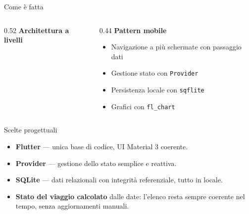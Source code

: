 \documentclass[aspectratio=169,11pt]{beamer}
\begin{document}
\begin{frame}{Come è fatta}
  \begin{columns}[T]
    \begin{column}{0.52\textwidth}
      \textbf{\color{primary}Architettura a livelli}
      \vspace{4pt}
      \begin{center}
      \end{center}
    \end{column}
    \begin{column}{0.44\textwidth}
      \textbf{\color{primary}Pattern mobile}
      \begin{itemize}
        \item Navigazione a più schermate con passaggio dati
        \item Gestione stato con \texttt{Provider}
        \item Persistenza locale con \texttt{sqflite}
        \item Grafici con \texttt{fl\_chart}
      \end{itemize}
    \end{column}
  \end{columns}
\end{frame}

\begin{frame}{Scelte progettuali}
  \begin{itemize}
    \item \textbf{Flutter} --- unica base di codice, UI Material 3 coerente.
    \item \textbf{Provider} --- gestione dello stato semplice e reattiva.
    \item \textbf{SQLite} --- dati relazionali con integrità referenziale, tutto in locale.
    \item \textbf{Stato del viaggio calcolato} dalle date: l'elenco resta sempre coerente
      nel tempo, senza aggiornamenti manuali.
  \end{itemize}
\end{frame}
\end{document}
